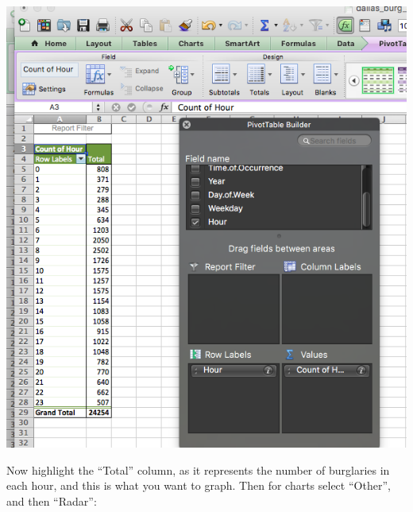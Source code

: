 \documentclass[
]{book}
\begin{document}
\includegraphics{imgs/hr_freq.png}

Now highlight the ``Total'' column, as it represents the number of burglaries in each hour, and this is what you want to graph. Then for charts select ``Other'', and then ``Radar'':
\end{document}
